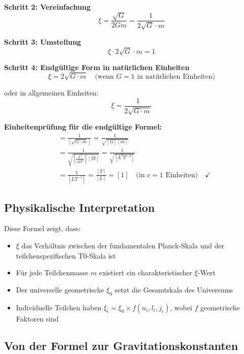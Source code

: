 \documentclass[12pt,a4paper]{article}
\theoremstyle{definition}
\begin{document}
	\textbf{Schritt 2: Vereinfachung}
	\begin{equation}
		\xi = \frac{\sqrt{G}}{2Gm} = \frac{1}{2\sqrt{G} \cdot m}
	\end{equation}
	
	\textbf{Schritt 3: Umstellung}
	\begin{equation}
		\xi \cdot 2\sqrt{G} \cdot m = 1
	\end{equation}
	
	\textbf{Schritt 4: Endgültige Form in natürlichen Einheiten}
	\begin{equation}
		\boxed{\xi = 2\sqrt{G \cdot m}} \quad \text{(wenn } G = 1 \text{ in natürlichen Einheiten)}
	\end{equation}
	
	oder in allgemeinen Einheiten:
	\begin{equation}
		\boxed{\xi = \frac{1}{2\sqrt{G \cdot m}}}
	\end{equation}
	
	\textbf{Einheitenprüfung für die endgültige Formel:}
	\begin{align}
		[\xi] &= \frac{1}{[\sqrt{G \cdot m}]} = \frac{1}{\sqrt{[G][m]}} \\
		&= \frac{1}{\sqrt{\left[\frac{L^3}{MT^2}\right][M]}} = \frac{1}{\sqrt{[L^3T^{-2}]}} \\
		&= \frac{1}{[LT^{-1}]} = \frac{[T]}{[L]} = [1] \quad \text{(in } c=1 \text{ Einheiten)} \quad \checkmark
	\end{align}
	
	\subsection{Physikalische Interpretation}
	
	Diese Formel zeigt, dass:
	\begin{itemize}
		\item $\xi$ das Verhältnis zwischen der fundamentalen Planck-Skala und der teilchenspezifischen T0-Skala ist
		\item Für jede Teilchenmasse $m$ existiert ein charakteristischer $\xi$-Wert
		\item Der universelle geometrische $\xi_0$ setzt die Gesamtskala des Universums
		\item Individuelle Teilchen haben $\xi_i = \xi_0 \times f(n_i, l_i, j_i)$, wobei $f$ geometrische Faktoren sind
	\end{itemize}
	
	\subsection{Von der Formel zur Gravitationskonstanten}
	
\end{document}
